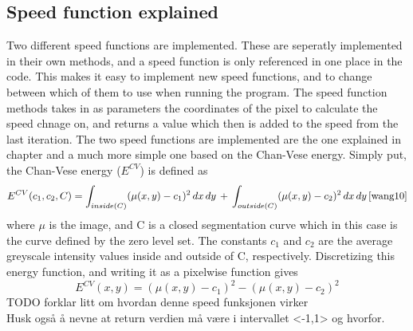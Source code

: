 \subsection{Speed function explained}
Two different speed functions are implemented. These are seperatly implemented in their own methods, and a speed function is only referenced in one place in the code. This makes it easy to implement new speed functions, and to change between which of them to use when running the program. The speed function methods takes in as parameters the coordinates of the pixel to calculate the speed chnage on, and returns a value which then is added to the speed from the last iteration. The two speed functions are implemented are the one explained in chapter \label{levelSetChap} and a much more simple one based on the Chan-Vese energy. Simply put, the Chan-Vese energy ($E^{CV}$) is defined as 
\begin{equation}
E^{CV}(c_1,c_2,C) = \int_{inside(C)} (\mu (x,y) - c_1)^2 \, dx \, dy \, + \, \int_{outside(C)} (\mu (x,y) - c_2)^2 \, dx \, dy \, \cite{wang10} %
\end{equation}
where $\mu$ is the image, and C is a closed segmentation curve which in this case is the curve defined by the zero level set. The constants $c_1$ and $c_2$ are the average greyscale intensity values inside and outside of C, respectively. Discretizing this energy function, and writing it as a pixelwise function gives
\begin{equation}
E^{CV}(x,y) = (\mu (x,y) - c_1)^2 - (\mu (x,y) - c_2)^2
\end{equation}
TODO forklar litt om hvordan denne speed funksjonen virker\\
Husk også å nevne at return verdien må være i intervallet <-1,1> og hvorfor.

